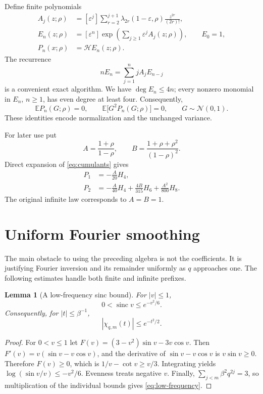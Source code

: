 \documentclass[11pt,a4paper]{article}
\numberwithin{equation}{section}
\newtheorem{lemma}[theorem]{Lemma}
\theoremstyle{definition}
\theoremstyle{remark}
\newcommand{\E}{\mathbb E}
\newcommand{\eps}{\varepsilon}
\newcommand{\sinc}{\operatorname{sinc}}
\newcommand{\Normal}{\mathcal N}
\newcommand{\co}[2]{[#1^{#2}]}
\begin{document}
Define finite polynomials
\begin{align}
 A_j(z;\rho)
 &=\co{\eps}{j}\sum_{r=2}^{j+1}
   \lambda_{2r}(1-\eps,\rho)\frac{z^{2r}}{(2r)!},
 \label{eq:Aj}\\
 E_n(z;\rho)
 &=\co{\eps}{n}\exp\left(\sum_{j\ge1}\eps^jA_j(z;\rho)\right),
 \qquad E_0=1,\label{eq:En}\\
 P_n(x;\rho)&=\mathcal H E_n(z;\rho).
 \label{eq:Pn}
\end{align}
The recurrence
\begin{equation}
 nE_n=\sum_{j=1}^{n}jA_jE_{n-j}
 \label{eq:recurrence}
\end{equation}
is a convenient exact algorithm. We have $\deg E_n\le4n$; every nonzero
monomial in $E_n$, $n\ge1$, has even degree at least four. Consequently,
\begin{equation}
 \E P_n(G;\rho)=0,
 \qquad \E\bigl[G^2P_n(G;\rho)\bigr]=0,
 \qquad G\sim\Normal(0,1).
 \label{eq:normalizations}
\end{equation}
These identities encode normalization and the unchanged variance.

For later use put
\begin{equation}
 A=\frac{1+\rho}{1-\rho},\qquad
 B=\frac{1+\rho+\rho^2}{(1-\rho)^2}.
 \label{eq:AB}
\end{equation}
Direct expansion of \eqref{eq:cumulants} gives
\begin{align}
 P_1&=-\frac A{20}H_4,\label{eq:P1}\\
 P_2&=-\frac A{40}H_4+\frac{4B}{315}H_6
       +\frac{A^2}{800}H_8.
 \label{eq:P2}
\end{align}
The original infinite law corresponds to $A=B=1$.

\section{Uniform Fourier smoothing}
\label{sec:fourier}

The main obstacle to using the preceding algebra is not the coefficients. It is
justifying Fourier inversion and its remainder uniformly as $q$ approaches one.
The following estimates handle both finite and infinite prefixes.

\begin{lemma}[A low-frequency sinc bound]
\label{lem:sinc}
For $|v|\le1$,
\begin{equation}
 0<\sinc v\le e^{-v^2/6}.
 \label{eq:sinc-bound}
\end{equation}
Consequently, for $|t|\le\beta^{-1}$,
\begin{equation}
 |\chi_{q,m}(t)|\le e^{-t^2/2}.
 \label{eq:low-frequency}
\end{equation}
\end{lemma}
\begin{proof}
For $0<v\le1$ let
$F(v)=(3-v^2)\sin v-3v\cos v$. Then
$F'(v)=v(\sin v-v\cos v)$, and the derivative of
$\sin v-v\cos v$ is $v\sin v\ge0$. Therefore $F(v)\ge0$, which is
$1/v-\cot v\ge v/3$. Integrating yields
$\log(\sin v/v)\le-v^2/6$. Evenness treats negative $v$.
Finally, $\sum_{j<m}\beta^2q^{2j}=3$, so multiplication of the individual
bounds gives \eqref{eq:low-frequency}.
\end{proof}
\end{document}
